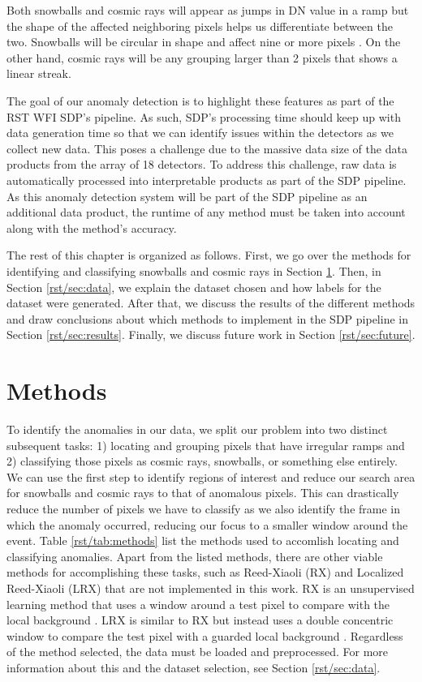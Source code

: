 Both snowballs and cosmic rays will appear as jumps in DN value in a ramp but the shape of the affected neighboring pixels helps us differentiate between the two.
Snowballs will be circular in shape and affect nine or more pixels \parencite{cillis2018snowballs}.
On the other hand, cosmic rays will be any grouping larger than 2 pixels that shows a linear streak. 

The goal of our anomaly detection is to highlight these features as part of the RST WFI SDP's pipeline. 
As such, SDP's processing time should keep up with data generation time so that we can identify issues within the detectors as we collect new data. 
This poses a challenge due to the massive data size of the data products from the array of 18 detectors. 
To address this challenge, raw data is automatically processed into interpretable products as part of the SDP pipeline. 
As this anomaly detection system will be part of the SDP pipeline as an additional data product, the runtime of any method must be taken into account along with the method's accuracy. 

The rest of this chapter is organized as follows.
First, we go over the methods for identifying and classifying snowballs and cosmic rays in Section \ref{rst/sec:methods}.
Then, in Section \ref{rst/sec:data}, we explain the dataset chosen and how labels for the dataset were generated.
After that, we discuss the results of the different methods and draw conclusions about which methods to implement in the SDP pipeline in Section \ref{rst/sec:results}.
Finally, we discuss future work in Section \ref{rst/sec:future}.

\section{Methods}
\label{rst/sec:methods}
To identify the anomalies in our data, we split our problem into two distinct subsequent tasks: 1) locating and grouping pixels that have irregular ramps and 2) classifying those pixels as cosmic rays, snowballs, or something else entirely.
We can use the first step to identify regions of interest and reduce our search area for snowballs and cosmic rays to that of anomalous pixels.
This can drastically reduce the number of pixels we have to classify as we also identify the frame in which the anomaly occurred, reducing our focus to a smaller window around the event. 
Table \ref{rst/tab:methods} list the methods used to accomlish locating and classifying anomalies.
Apart from the listed methods, there are other viable methods for accomplishing these tasks, such as Reed-Xiaoli (RX) and Localized Reed-Xiaoli (LRX) that are not implemented in this work.
RX is an unsupervised learning method that uses a window around a test pixel to compare with the local background \parencite{reed1990adaptive}.
LRX is similar to RX but instead uses a double concentric window to compare the test pixel with a guarded local background \parencite{molero2013analysis}.
Regardless of the method selected, the data must be loaded and preprocessed.
For more information about this and the dataset selection, see Section \ref{rst/sec:data}.

